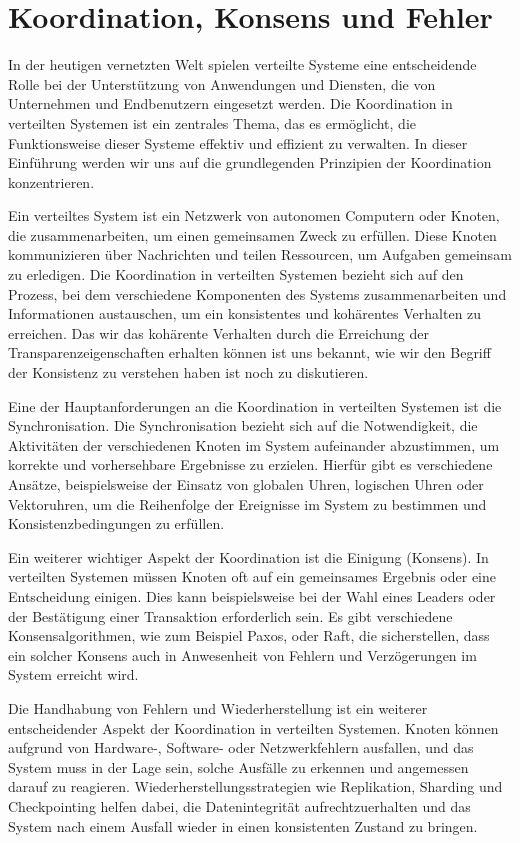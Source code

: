 \documentclass[../vs-script-first-v01.tex]{subfiles}
\begin{document}
\section{Koordination, Konsens und Fehler}

In der heutigen vernetzten Welt spielen verteilte Systeme eine entscheidende Rolle bei der Unterstützung von Anwendungen und Diensten, die von Unternehmen und Endbenutzern eingesetzt werden. Die Koordination in verteilten Systemen ist ein zentrales Thema, das es ermöglicht, die Funktionsweise dieser Systeme effektiv und effizient zu verwalten. In dieser Einführung werden wir uns auf die grundlegenden Prinzipien der Koordination konzentrieren.

Ein verteiltes System ist ein Netzwerk von autonomen Computern oder Knoten, die zusammenarbeiten, um einen gemeinsamen Zweck zu erfüllen. Diese Knoten kommunizieren über Nachrichten und teilen Ressourcen, um Aufgaben gemeinsam zu erledigen. Die Koordination in verteilten Systemen bezieht sich auf den Prozess, bei dem verschiedene Komponenten des Systems zusammenarbeiten und Informationen austauschen, um ein konsistentes und kohärentes Verhalten zu erreichen. Das wir das kohärente Verhalten durch die Erreichung der Transparenzeigenschaften erhalten können ist uns bekannt, wie wir den Begriff der Konsistenz zu verstehen haben ist noch zu diskutieren. 

Eine der Hauptanforderungen an die Koordination in verteilten Systemen ist die Synchronisation. Die Synchronisation bezieht sich auf die Notwendigkeit, die Aktivitäten der verschiedenen Knoten im System aufeinander abzustimmen, um korrekte und vorhersehbare Ergebnisse zu erzielen. Hierfür gibt es verschiedene Ansätze, beispielsweise der Einsatz von globalen Uhren, logischen Uhren oder Vektoruhren, um die Reihenfolge der Ereignisse im System zu bestimmen und Konsistenzbedingungen zu erfüllen.

Ein weiterer wichtiger Aspekt der Koordination ist die Einigung (Konsens). In verteilten Systemen müssen Knoten oft auf ein gemeinsames Ergebnis oder eine Entscheidung einigen. Dies kann beispielsweise bei der Wahl eines Leaders oder der Bestätigung einer Transaktion erforderlich sein. Es gibt verschiedene Konsensalgorithmen, wie zum Beispiel Paxos, oder Raft, die sicherstellen, dass ein solcher Konsens auch in Anwesenheit von Fehlern und Verzögerungen im System erreicht wird.

Die Handhabung von Fehlern und Wiederherstellung ist ein weiterer entscheidender Aspekt der Koordination in verteilten Systemen. Knoten können aufgrund von Hardware-, Software- oder Netzwerkfehlern ausfallen, und das System muss in der Lage sein, solche Ausfälle zu erkennen und angemessen darauf zu reagieren. Wiederherstellungsstrategien wie Replikation, Sharding und Checkpointing helfen dabei, die Datenintegrität aufrechtzuerhalten und das System nach einem Ausfall wieder in einen konsistenten Zustand zu bringen.
\end{document}
